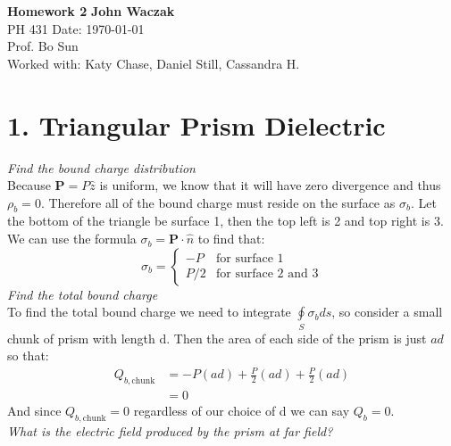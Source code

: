 \documentclass[a4paper, 11pt]{article}
\begin{document}
\noindent
\large\textbf{Homework 2} \hfill \textbf{John Waczak} \\
\normalsize PH 431 \hfill  Date: \today \\
Prof. Bo Sun  \\
Worked with: Katy Chase, Daniel Still, Cassandra H. \\

\section*{1. Triangular Prism Dielectric}
\textit{Find the bound charge distribution} \\

\noindent Because $\mathbf{P} = P\hat{z}$ is uniform, we know that it will have zero divergence and thus $\rho_b = 0$. Therefore all of the bound charge must reside on the surface as $\sigma_b$. Let the bottom of the triangle be surface 1, then the top left is 2 and top right is 3. We can use the formula $\sigma_b = \mathbf{P} \cdot \hat{n}$ to find that: 
	\begin{equation*}
		\sigma_b = 
		\begin{cases}
			-P & \text{for surface 1} \\
			P/2 & \text{for surface 2 and 3}
		\end{cases}
	\end{equation*}
\noindent\textit{Find the total bound charge}\\

	
\noindent To find the total bound charge we need to integrate $\oint\limits_S \sigma_b ds$, so consider a small chunk of prism with length d. Then the area of each side of the prism is just $ad$ so that: 
	\begin{align*}
		Q_{b,\text{chunk}}&= -P(ad) + \frac{P}{2}(ad) + \frac{P}{2}(ad) \\ 
		&= 0
	\end{align*}
\noindent And since $Q_{b,\text{chunk}}=0$ regardless of our choice of d we can say $Q_b=0$. \\

\noindent\textit{What is the electric field produced by the prism at far field?}\\
 
\end{document}
